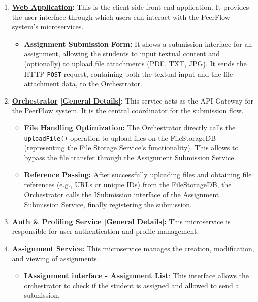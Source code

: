 \begin{enumerate}
    \item \textbf{\hyperref[def:WebApplication]{Web Application}:} This is the client-side front-end application. It provides the user interface through which users can interact with the PeerFlow system’s microservices.
    \begin{itemize}
        \item \textbf{Assignment Submission Form:} It shows a submission interface for an assignment, allowing the students to input textual content and (optionally) to upload file attachments (PDF, TXT, JPG). It sends the HTTP \texttt{POST} request, containing both the textual input and the file attachment data, to the \hyperref[def:Orchestrator]{Orchestrator}.
    \end{itemize}
    \item \textbf{\hyperref[def:Orchestrator]{Orchestrator} \hyperref[def:GenDetailsOrchestrator]{[General Details]}:} This service acts as the API Gateway for the PeerFlow system. It is the central coordinator for the submission flow.
    \begin{itemize}
        \item \textbf{File Handling Optimization:} The \hyperref[def:Orchestrator]{Orchestrator} directly calls the \texttt{uploadFile()} operation to upload files on the FileStorageDB (representing the \hyperref[def:FileStorageService]{File Storage Service}'s functionality). This allows to bypass the file transfer through the \hyperref[def:AssignmentSubmissionService]{Assignment Submission Service}.
        \item \textbf{Reference Passing:} After successfully uploading files and obtaining file references (e.g., URLs or unique IDs) from the FileStorageDB, the \hyperref[def:Orchestrator]{Orchestrator} calls the ISubmission interface of the \hyperref[def:AssignmentSubmissionService]{Assignment Submission Service}, finally registering the submission.
    \end{itemize}
    
    \item \textbf{\hyperref[def:AuthProfilingService]{Auth \& Profiling Service} \hyperref[def:GenDetailsAuth]{[General Details]}:} This microservice is responsible for user authentication and profile management.

    \item \textbf{\hyperref[def:AssignmentService]{Assignment Service}:} This microservice manages the creation, modification, and viewing of assignments.
    \begin{itemize}
        \item \textbf{IAssignment interface - Assignment List}: This interface allows the orchestrator to check if the student is assigned and allowed to send a submission.
    \end{itemize}


\end{enumerate}
